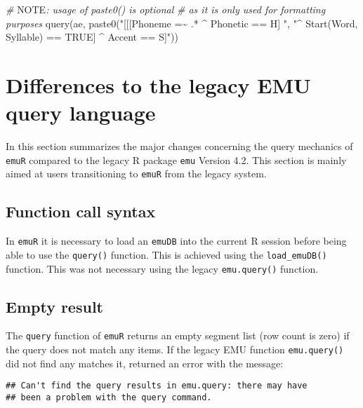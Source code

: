 \documentclass[
]{book}
\newenvironment{Shaded}{\begin{snugshade}}{\end{snugshade}}
\newcommand{\AlertTok}[1]{\textcolor[rgb]{0.94,0.16,0.16}{#1}}
\newcommand{\CommentTok}[1]{\textcolor[rgb]{0.56,0.35,0.01}{\textit{#1}}}
\newcommand{\FunctionTok}[1]{\textcolor[rgb]{0.00,0.00,0.00}{#1}}
\newcommand{\NormalTok}[1]{#1}
\newcommand{\StringTok}[1]{\textcolor[rgb]{0.31,0.60,0.02}{#1}}
\begin{document}
\begin{Shaded}
\begin{Highlighting}[]
\CommentTok{\# }\AlertTok{NOTE}\CommentTok{: usage of paste0() is optional}
\CommentTok{\# as it is only used for formatting purposes}
\FunctionTok{query}\NormalTok{(ae, }\FunctionTok{paste0}\NormalTok{(}\StringTok{"[[[Phoneme =\textasciitilde{} .* \^{} Phonetic == H] "}\NormalTok{,}
                 \StringTok{"\^{} Start(Word, Syllable) == TRUE] \^{} Accent == S]"}\NormalTok{))}
\end{Highlighting}
\end{Shaded}

\hypertarget{differences-to-the-legacy-emu-query-language}{%
\section{Differences to the legacy EMU query language}\label{differences-to-the-legacy-emu-query-language}}

In this section summarizes the major changes concerning the query mechanics of \texttt{emuR} compared to the legacy R package \texttt{emu} Version 4.2. This section is mainly aimed at users transitioning to \texttt{emuR} from the legacy system.

\hypertarget{function-call-syntax}{%
\subsection{Function call syntax}\label{function-call-syntax}}

In \texttt{emuR} it is necessary to load an \texttt{emuDB} into the current R session before being able to use the \texttt{query()} function. This is achieved using the \texttt{load\_emuDB()} function. This was not necessary using the legacy \texttt{emu.query()} function.

\hypertarget{empty-result}{%
\subsection{Empty result}\label{empty-result}}

The \texttt{query} function of \texttt{emuR} returns an empty segment list (row count is zero) if the query does not match any items. If the legacy EMU function \texttt{emu.query()} did not find any matches it, returned an error with the message:

\begin{verbatim}
## Can't find the query results in emu.query: there may have 
## been a problem with the query command.
\end{verbatim}
\end{document}
